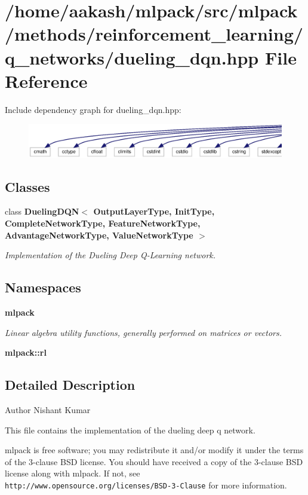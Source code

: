 \section{/home/aakash/mlpack/src/mlpack/methods/reinforcement\+\_\+learning/q\+\_\+networks/dueling\+\_\+dqn.hpp File Reference}
\label{dueling__dqn_8hpp}
Include dependency graph for dueling\+\_\+dqn.\+hpp\+:
\nopagebreak
\begin{figure}[H]
\begin{center}
\leavevmode
\includegraphics[width=350pt]{dueling__dqn_8hpp__incl}
\end{center}
\end{figure}
\subsection*{Classes}
\begin{DoxyCompactItemize}
\item 
class \textbf{ Dueling\+D\+Q\+N$<$ Output\+Layer\+Type, Init\+Type, Complete\+Network\+Type, Feature\+Network\+Type, Advantage\+Network\+Type, Value\+Network\+Type $>$}
\begin{DoxyCompactList}\small\item\em Implementation of the Dueling Deep Q-\/\+Learning network. \end{DoxyCompactList}\end{DoxyCompactItemize}
\subsection*{Namespaces}
\begin{DoxyCompactItemize}
\item 
 \textbf{ mlpack}
\begin{DoxyCompactList}\small\item\em Linear algebra utility functions, generally performed on matrices or vectors. \end{DoxyCompactList}\item 
 \textbf{ mlpack\+::rl}
\end{DoxyCompactItemize}


\subsection{Detailed Description}
\begin{DoxyAuthor}{Author}
Nishant Kumar
\end{DoxyAuthor}
This file contains the implementation of the dueling deep q network.

mlpack is free software; you may redistribute it and/or modify it under the terms of the 3-\/clause B\+SD license. You should have received a copy of the 3-\/clause B\+SD license along with mlpack. If not, see {\tt http\+://www.\+opensource.\+org/licenses/\+B\+S\+D-\/3-\/\+Clause} for more information. 